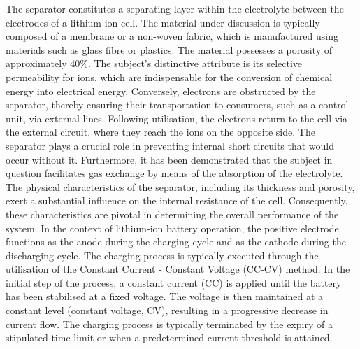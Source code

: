 The separator constitutes a separating layer within the electrolyte between the electrodes of a lithium-ion cell. The material under discussion is typically composed of a membrane or a non-woven fabric, which is manufactured using materials such as glass fibre or plastics. The material possesses a porosity of approximately 40\%. The subject's distinctive attribute is its selective permeability for ions, which are indispensable for the conversion of chemical energy into electrical energy. Conversely, electrons are obstructed by the separator, thereby ensuring their transportation to consumers, such as a control unit, via external lines. Following utilisation, the electrons return to the cell via the external circuit, where they reach the ions on the opposite side.\newline
The separator plays a crucial role in preventing internal short circuits that would occur without it. Furthermore, it has been demonstrated that the subject in question facilitates gas exchange by means of the absorption of the electrolyte. The physical characteristics of the separator, including its thickness and porosity, exert a substantial influence on the internal resistance of the cell. Consequently, these characteristics are pivotal in determining the overall performance of the system.\autocite[S. 80]{Korthauer.2013}
In the context of lithium-ion battery operation, the positive electrode functions as the anode during the charging cycle and as the cathode during the discharging cycle. The charging process is typically executed through the utilisation of the Constant Current - Constant Voltage (CC-CV) method. In the initial step of the process, a constant current (CC) is applied until the battery has been stabilised at a fixed voltage. The voltage is then maintained at a constant level (constant voltage, CV), resulting in a progressive decrease in current flow. The charging process is typically terminated by the expiry of a stipulated time limit or when a predetermined current threshold is attained.\autocite[S. 15]{Korthauer.2013}
